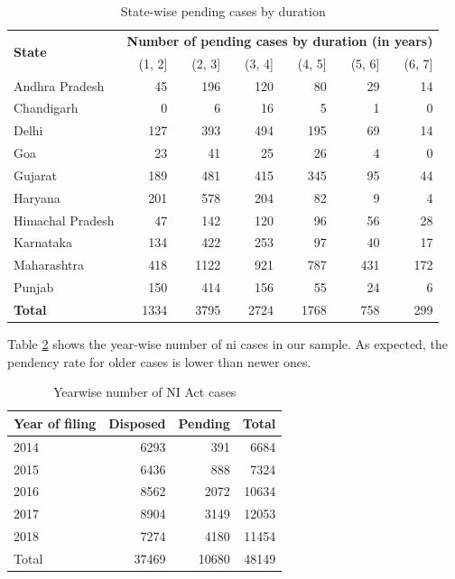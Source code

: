 \documentclass[12pt,a4paper]{article}
\begin{document}
{\footnotesize
\begin{longtable}{@{}lrrrrrr@{}}
 \caption{State-wise pending cases by duration}\label{tab:state_pending}\\
\toprule
\multirow{2}{*}{\textbf{State}} & \multicolumn{6}{c}{\textbf{Number of pending cases by duration (in years)}} \\
\cmidrule{2-7}
 & (1, 2] & (2, 3] & (3, 4] & (4, 5] & (5, 6] & (6, 7] \\
\midrule
\endhead
Andhra Pradesh & 45 & 196 & 120 & 80 & 29 & 14 \\
Chandigarh & 0 & 6 & 16 & 5 & 1 & 0 \\
Delhi & 127 & 393 & 494 & 195 & 69 & 14 \\
Goa & 23 & 41 & 25 & 26 & 4 & 0 \\
Gujarat & 189 & 481 & 415 & 345 & 95 & 44 \\
Haryana & 201 & 578 & 204 & 82 & 9 & 4 \\
Himachal Pradesh & 47 & 142 & 120 & 96 & 56 & 28 \\
Karnataka & 134 & 422 & 253 & 97 & 40 & 17 \\
Maharashtra & 418 & 1122 & 921 & 787 & 431 & 172 \\
Punjab & 150 & 414 & 156 & 55 & 24 & 6 \\
\midrule
\textbf{Total} & 1334 & 3795 & 2724 & 1768 & 758 & 299 \\
\bottomrule
\end{longtable}
}

Table \ref{tab:yearWise_ni} shows the year-wise number of \gls{ni} cases in our sample. As expected, the pendency rate for older cases is lower than newer ones.

\begin{longtable}{@{}lrr|r@{}}
 \caption{Yearwise number of NI Act cases}\label{tab:yearWise_ni}\\
\toprule
\textbf{Year of filing} & \textbf{Disposed} & \textbf{Pending} & \textbf{Total} \\
\midrule\endhead
2014 & 6293 & 391 & 6684 \\
2015 & 6436 & 888 & 7324 \\
2016 & 8562 & 2072 & 10634 \\
2017 & 8904 & 3149 & 12053 \\
2018 & 7274 & 4180 & 11454 \\
\midrule
Total & 37469 & 10680 & 48149 \\
\bottomrule
\end{longtable}
\end{document}
